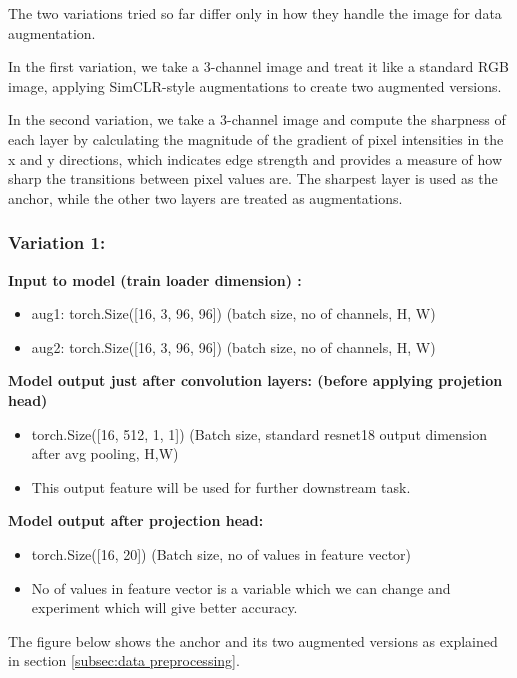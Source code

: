 \documentclass[12pt,twoside,a4paper,parskip]{scrbook} %
\begin{document}
The two variations tried so far differ only in how they handle the image for data augmentation. 

In the first variation, we take a 3-channel image and treat it like a standard RGB image, applying SimCLR-style augmentations to create two augmented versions.

In the second variation, we take a 3-channel image and compute the sharpness of each layer by calculating the magnitude of the gradient of pixel intensities in the x and y directions, which indicates edge strength and provides a measure of how sharp the transitions between pixel values are. The sharpest layer is used as the anchor, while the other two layers are treated as augmentations. 

\subsubsection{Variation 1:}
\textbf{Input to model (train loader dimension) :} 

\begin{itemize}
  \item aug1: torch.Size([16, 3, 96, 96])        (batch size, no of channels, H, W)
  \item aug2: torch.Size([16, 3, 96, 96])        (batch size, no of channels, H, W) \vspace{1em}
\end{itemize} \vspace{1em}
\textbf{Model output just after convolution layers: (before applying projetion head)} 
\begin{itemize}
  \item torch.Size([16, 512, 1, 1]) (Batch size, standard resnet18 output dimension after avg pooling, H,W)   
  \item This output feature will be used for further downstream task.  \vspace{1em}
\end{itemize}

\textbf{Model output after projection head:}
\begin{itemize}
  \item torch.Size([16, 20])  (Batch size, no of values in feature vector)  
  \item No of values in feature vector is a variable which we can change and experiment which will give better accuracy.
\end{itemize}

The figure below shows the anchor and its two augmented versions as explained in section \ref{subsec:data preprocessing}.
\end{document}
